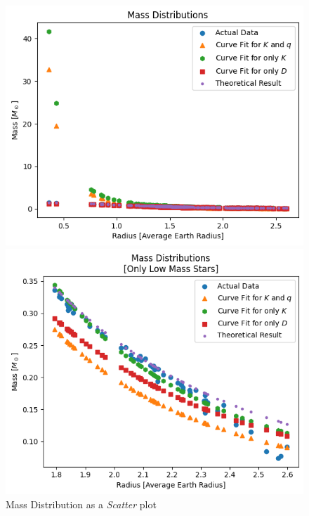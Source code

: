 \documentclass[letterpaper,12pt]{article}
\begin{document}
\begin{figure}[H]
\begin{minipage}{.5\textwidth}
\centerline{\includegraphics[width=\linewidth]{figures/appendix/1_2_11_n_s_ms_r.png}}
\end{minipage}
\begin{minipage}{.5\textwidth}
\centerline{\includegraphics[width=\linewidth]{figures/appendix/1_2_12_n_s_ms_r_.png}}
\end{minipage}
\caption{Mass Distribution as a \textit{Scatter} plot}
\end{figure}
\end{document}
